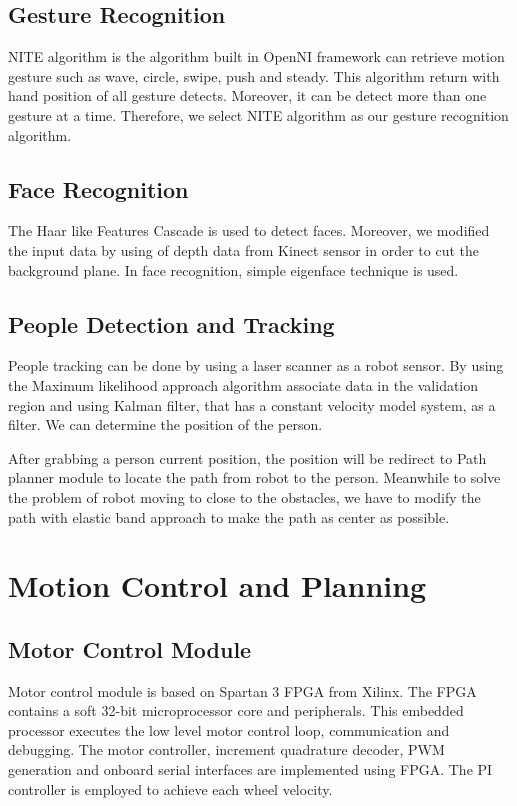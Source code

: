 \documentclass{llncs}
\begin{document}
\subsection{Gesture Recognition}

NITE algorithm is the algorithm built in OpenNI framework can retrieve motion gesture such as wave, circle, swipe, push and steady. This algorithm return with hand position of all gesture detects.
Moreover, it can be detect more than one gesture at a time. Therefore, we select NITE algorithm as our
gesture recognition algorithm.

\subsection{Face Recognition}

The Haar like Features Cascade is used to detect faces. Moreover, we modified the input data by using of depth data from Kinect sensor in order to cut the background plane. In face recognition, simple eigenface technique is used.

\subsection{People Detection and Tracking}

People tracking can be done by using a laser scanner as a robot sensor. By using the Maximum likelihood approach algorithm associate data in the validation region and using Kalman filter, that has a constant velocity model system, as a filter. We can determine the position of the person.

After grabbing a person current position, the position will be redirect to Path planner module to locate the path from robot to the person. Meanwhile to solve the problem of robot moving to close to the obstacles, we have to modify the path with elastic band approach to make the path as center as possible.

\section{Motion Control and Planning}

\subsection{Motor Control Module}

Motor control module is based on Spartan 3 FPGA from Xilinx. The FPGA contains a soft 32-bit microprocessor core and peripherals. This embedded processor executes the low level motor control loop, communication and debugging. The motor controller, increment quadrature decoder, PWM generation and onboard serial interfaces are implemented using FPGA. The PI controller is employed to achieve each wheel velocity. 
\end{document}

